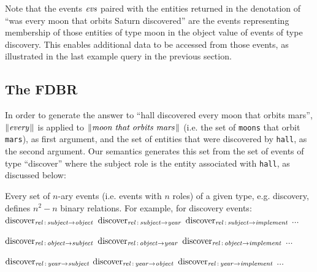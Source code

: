 \documentclass[../main.tex]{subfiles}
\begin{document}
\begin{refsection}
Note that the events $\evs$ paired with the entities returned in the denotation of ``was every moon that orbits Saturn discovered'' are the events representing membership of those entities of type moon in the object value of events of type discovery. This enables additional data to be accessed from those events, as illustrated in the last example query in the previous section.

\subsection{The FDBR}

In order to generate the  answer to ``hall discovered every moon that orbits mars'', $\meaningof{every}$ is applied to $\meaningof{moon\ that\ orbits\ mars}$ (i.e. the set of \texttt{moons} that orbit \texttt{mars}), as first argument, and  the set of entities  that were discovered by \texttt{hall}, as the second argument. Our semantics generates this set from the set of events of type ``discover'' where the subject role is the entity associated with \texttt{hall}, as discussed below:

\noindent Every set of $n$-ary events (i.e. events with $n$ roles) of a given type, e.g. discovery, defines $n^2 - n$ binary relations. For example, for discovery events: \\

\noindent $\relationn{discover}{subject}{object}$ $\relationn{discover}{subject}{year}$ $\relationn{discover}{subject}{implement}$ $\dots$

\noindent $\relationn{discover}{object}{subject}$ $\relationn{discover}{object}{year}$ $\relationn{discover}{object}{implement}$ $\dots$

\noindent $\relationn{discover}{year}{subject}$ $\relationn{discover}{year}{object}$ $\relationn{discover}{year}{implement}$ $\dots$ \\


\end{refsection}
\end{document}
